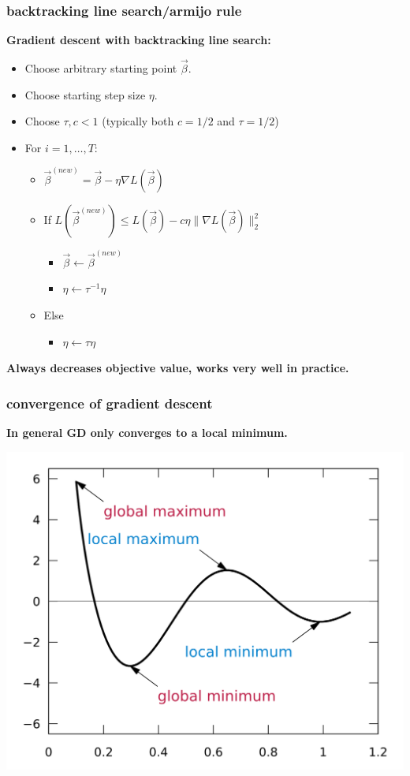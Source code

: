 \documentclass[handout,compress]{beamer}
\begin{document}
\begin{frame}
	\frametitle{backtracking  line search/armijo rule}
	\small
	\textbf{Gradient descent with backtracking line search:}
	\begin{itemize}
		\item Choose arbitrary starting point $\vec{\beta}$.
		\item Choose starting step size $\eta$. 
		\item Choose $\tau, c < 1$ (typically both $c = 1/2$ and $\tau = 1/2$)
		\item For $i = 1,\ldots, T$:
		\begin{itemize}
			\item $\vec{\beta}^{(new)} = \vec{\beta} - \eta \nabla L(\vec{\beta})$
			\item If $L(\vec{\beta}^{(new)}) \leq L(\vec{\beta}) - c\eta  \|\nabla L(\vec{\beta})\|_2^2$
				\begin{itemize}
					\item $\vec{\beta} \leftarrow \vec{\beta}^{(new)}$
					\item $\eta \leftarrow \tau^{-1}\eta$
				\end{itemize}
			\item Else
				\begin{itemize}
					\item $\eta \leftarrow \tau\eta$
				\end{itemize}
		\end{itemize}
	\end{itemize}
\textbf{\alert{Always decreases objective value, works very well in practice.}}
\end{frame}

\begin{frame}[t]
	\frametitle{convergence of gradient descent}
	\begin{center}
		\textbf{In general GD only converges to a \alert{local minimum}.}
		
		\includegraphics[width=.7\textwidth]{local_min.png}
	\end{center}
\end{frame}
\end{document}
